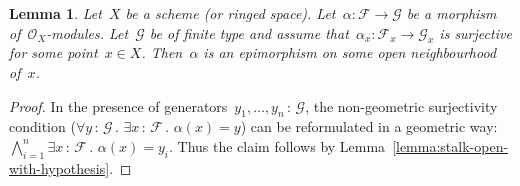 \documentclass[10pt]{amsart}
\theoremstyle{definition}
\theoremstyle{plain}
\newtheorem{lemma}[defn]{Lemma}
\theoremstyle{remark}
\newcommand{\F}{\mathcal{F}}
\renewcommand{\G}{\mathcal{G}}
\renewcommand{\O}{\mathcal{O}}
\newcommand{\?}{\,{:}\,}
\renewcommand{\_}{\mathpunct{.}\,}
\begin{document}
\begin{lemma}Let~$X$ be a scheme (or ringed space). Let~$\alpha : \F \to \G$ be
a morphism of~$\O_X$-modules. Let~$\G$ be of finite type and assume
that~$\alpha_x : \F_x \to \G_x$ is surjective for some point~$x \in X$.
Then~$\alpha$ is an epimorphism on some open neighbourhood of~$x$.\end{lemma}
\begin{proof}In the presence of generators~$y_1,\ldots,y_n\?\G$, the
non-geometric surjectivity condition ($\forall y\?\G\_ \exists x\?\F\_
\alpha(x) = y$) can be reformulated in a geometric way: $\bigwedge_{i=1}^n
\exists x\?\F\_ \alpha(x) = y_i$. Thus the claim follows by
Lemma~\ref{lemma:stalk-open-with-hypothesis}.\end{proof}

\end{document}
